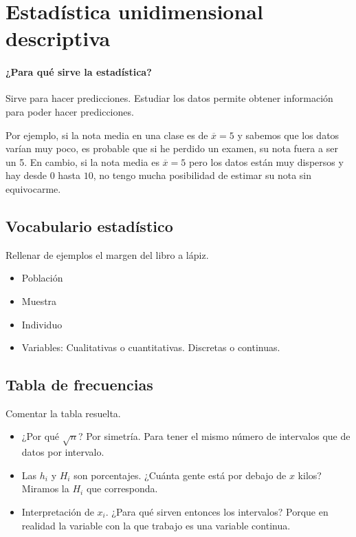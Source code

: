 
\section{Estadística unidimensional descriptiva}

\paragraph{¿Para qué sirve la estadística?} Sirve para hacer predicciones. Estudiar los datos permite obtener información para poder hacer predicciones. 

Por ejemplo, si la nota media en una clase es de $\overline{x}=5$ y sabemos que los datos varían muy poco, es probable que si he perdido un examen, su nota fuera a ser un 5. En cambio, si la nota media es $\overline{x} = 5$ pero los datos están muy dispersos y hay desde $0$ hasta $10$, no tengo mucha posibilidad de estimar su nota sin equivocarme.

\subsection{Vocabulario estadístico}

Rellenar de ejemplos el margen del libro a lápiz.

\begin{itemize}
	\item Población
	\item Muestra
	\item Individuo
	\item Variables:
		\subitem Cualitativas o cuantitativas.
		\subitem Discretas o continuas.
\end{itemize}

\subsection{Tabla de frecuencias}
Comentar la tabla resuelta. 

\begin{itemize}
	\item ¿Por qué $\sqrt{n}$? Por simetría. Para tener el mismo número de intervalos que de datos por intervalo.
	\item Las $h_i$ y $H_i$ son porcentajes. ¿Cuánta gente está por debajo de $x$ kilos? Miramos la $H_i$ que corresponda.
	\item Interpretación de $x_i$. ¿Para qué sirven entonces los intervalos? Porque en realidad la variable con la que trabajo es una variable continua.
\end{itemize}

